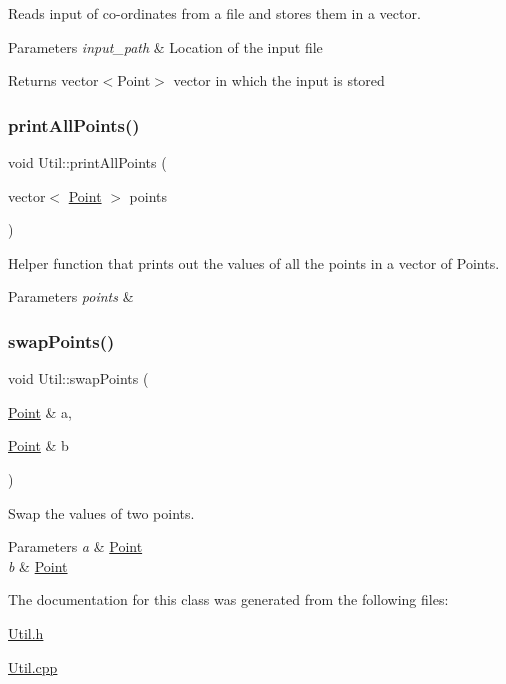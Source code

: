 Reads input of co-\/ordinates from a file and stores them in a vector. 


\begin{DoxyParams}{Parameters}
{\em input\+\_\+path} & Location of the input file \\
\hline
\end{DoxyParams}
\begin{DoxyReturn}{Returns}
vector$<$\+Point$>$ vector in which the input is stored 
\end{DoxyReturn}
\mbox{\label{classUtil_a178628de18adc2807d3a331a060e62a0}} 
\subsubsection{\texorpdfstring{print\+All\+Points()}{printAllPoints()}}
{\footnotesize\ttfamily void Util\+::print\+All\+Points (\begin{DoxyParamCaption}\item[{vector$<$ \hyperlink{classPoint}{Point} $>$}]{points }\end{DoxyParamCaption})}



Helper function that prints out the values of all the points in a vector of Points. 


\begin{DoxyParams}{Parameters}
{\em points} & \\
\hline
\end{DoxyParams}
\mbox{\label{classUtil_a40ff824653381aaceaa05e60a5300cc1}} 
\subsubsection{\texorpdfstring{swap\+Points()}{swapPoints()}}
{\footnotesize\ttfamily void Util\+::swap\+Points (\begin{DoxyParamCaption}\item[{\hyperlink{classPoint}{Point} \&}]{a,  }\item[{\hyperlink{classPoint}{Point} \&}]{b }\end{DoxyParamCaption})}



Swap the values of two points. 


\begin{DoxyParams}{Parameters}
{\em a} & \hyperlink{classPoint}{Point} \\
\hline
{\em b} & \hyperlink{classPoint}{Point} \\
\hline
\end{DoxyParams}


The documentation for this class was generated from the following files\+:\begin{DoxyCompactItemize}
\item 
\hyperlink{Util_8h}{Util.\+h}\item 
\hyperlink{Util_8cpp}{Util.\+cpp}\end{DoxyCompactItemize}
